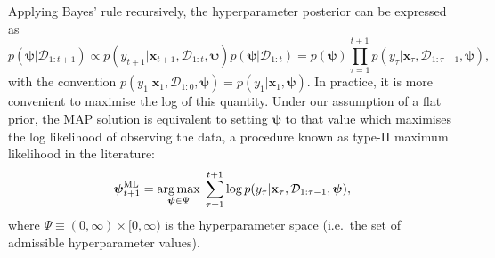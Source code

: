 Applying Bayes' rule recursively, the hyperparameter posterior can be expressed as
\begin{equation}
	p(\boldsymbol{\psi}|\mathcal{D}_{1:t+1})
	\propto p(y_{t+1}|\mathbf{x}_{t+1}, \mathcal{D}_{1:t}, \boldsymbol{\psi})p(\boldsymbol{\psi}|\mathcal{D}_{1:t})
	= p(\boldsymbol{\psi})
	\prod_{\tau=1}^{t+1} p(y_\tau|\mathbf{x}_\tau, \mathcal{D}_{1:\tau-1}, \boldsymbol{\psi}),
\end{equation}
with the convention $p(y_1|\mathbf{x}_1, \mathcal{D}_{1:0}, \boldsymbol{\psi}) = p(y_1|\mathbf{x}_1, \boldsymbol{\psi})$. In practice, it is more convenient to maximise the log of this quantity. Under our assumption of a flat prior, the MAP solution is equivalent to setting $\boldsymbol{\psi}$ to that value which maximises the log likelihood of observing the data, a procedure known as type-II maximum likelihood in the literature:
\begin{equation}
\label{eq:ml-hyperparams}
	\boldsymbol{\psi}_{t+1}^\text{ML}
	= \operatorname*{arg\,max}_{\boldsymbol{\psi}\in\Psi} \; \sum_{\tau=1}^{t+1} \log p(y_\tau|\mathbf{x}_\tau, \mathcal{D}_{1:\tau-1}, \boldsymbol{\psi}),
\end{equation}
where $\Psi \equiv (0, \infty) \times [0, \infty)$ is the hyperparameter space (i.e.\ the set of admissible hyperparameter values).

